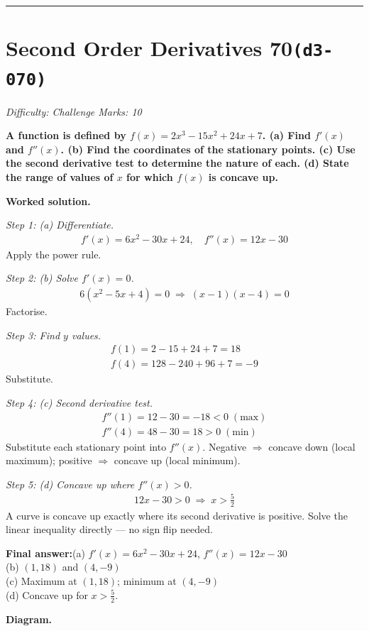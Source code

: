 \documentclass[11pt]{article}
\newcommand{\question}[1]{\par\medskip\noindent\textbf{#1}\par}
\begin{document}
\medskip\hrule

\section*{Second Order Derivatives 70\quad\small\texttt{(d3-070)}}
\textit{Difficulty: Challenge \quad\textbar\quad Marks: 10}

\question{A function is defined by \( f(x) = 2x^3 - 15x^2 + 24x + 7 \). (a) Find \( f'(x) \) and \( f''(x) \). (b) Find the coordinates of the stationary points. (c) Use the second derivative test to determine the nature of each. (d) State the range of values of \( x \) for which \( f(x) \) is concave up.}

\textbf{Worked solution.}

\textit{Step 1: (a) Differentiate.}
\[\begin{gathered}
f'(x) = 6x^2 - 30x + 24, \quad f''(x) = 12x - 30
\end{gathered}\]
Apply the power rule.

\textit{Step 2: (b) Solve \( f'(x) = 0 \).}
\[\begin{gathered}
6(x^2 - 5x + 4) = 0 \;\Rightarrow\; (x-1)(x-4) = 0
\end{gathered}\]
Factorise.

\textit{Step 3: Find \( y \) values.}
\[\begin{gathered}
f(1) = 2 - 15 + 24 + 7 = 18 \\ f(4) = 128 - 240 + 96 + 7 = -9
\end{gathered}\]
Substitute.

\textit{Step 4: (c) Second derivative test.}
\[\begin{gathered}
f''(1) = 12 - 30 = -18 < 0 \; (\text{max}) \\ f''(4) = 48 - 30 = 18 > 0 \; (\text{min})
\end{gathered}\]
Substitute each stationary point into \( f''(x) \). Negative \(\Rightarrow\) concave down (local maximum); positive \(\Rightarrow\) concave up (local minimum).

\textit{Step 5: (d) Concave up where \( f''(x) > 0 \).}
\[\begin{gathered}
12x - 30 > 0 \;\Rightarrow\; x > \tfrac{5}{2}
\end{gathered}\]
A curve is concave up exactly where its second derivative is positive. Solve the linear inequality directly --- no sign flip needed.

\begin{answerbox}
\textbf{Final answer:}\quad (a) \(\displaystyle  f'(x) = 6x^2 - 30x + 24 \), \(\displaystyle  f''(x) = 12x - 30 \) \\[3pt]  (b) \(\displaystyle  (1, 18) \) and \(\displaystyle  (4, -9) \) \\[3pt]  (c) Maximum at \(\displaystyle  (1, 18) \); minimum at \(\displaystyle  (4, -9) \) \\[3pt]  (d) Concave up for \(\displaystyle  x > \tfrac{5}{2} \).
\end{answerbox}
\textbf{Diagram.}
\end{document}
